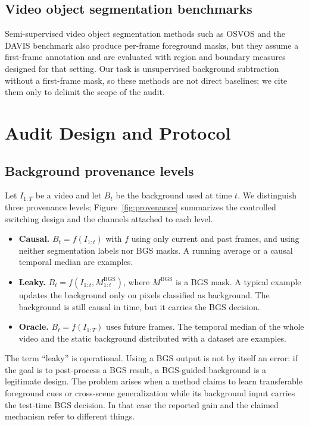 \documentclass[sn-mathphys-num,iicol]{sn-jnl}
\begin{document}
\subsection{Video object segmentation benchmarks}
Semi-supervised video object segmentation methods such as OSVOS
\cite{osvos2017} and the DAVIS benchmark \cite{davis2016} also produce per-frame
foreground masks, but they assume a first-frame annotation and are evaluated with
region and boundary measures designed for that setting. Our task is unsupervised
background subtraction without a first-frame mask, so these methods are not
direct baselines; we cite them only to delimit the scope of the audit.

\section{Audit Design and Protocol}\label{sec:protocol}

\subsection{Background provenance levels}\label{sec:provenance}

Let $I_{1:T}$ be a video and let $B_t$ be the background used at time $t$. We
distinguish three provenance levels; Figure~\ref{fig:provenance} summarizes the
controlled switching design and the channels attached to each level.
\begin{itemize}
\item \textbf{Causal.} $B_t = f(I_{1:t})$ with $f$ using only current and past
frames, and using neither segmentation labels nor BGS masks. A running average or
a causal temporal median are examples.
\item \textbf{Leaky.} $B_t = f(I_{1:t}, M_{1:t}^{\mathrm{BGS}})$, where
$M^{\mathrm{BGS}}$ is a BGS mask. A typical example updates the background only
on pixels classified as background. The background is still causal in time, but
it carries the BGS decision.
\item \textbf{Oracle.} $B_t = f(I_{1:T})$ uses future frames. The temporal median
of the whole video and the static background distributed with a dataset are
examples.
\end{itemize}

The term ``leaky'' is operational. Using a BGS output is not by itself an error:
if the goal is to post-process a BGS result, a BGS-guided background is a
legitimate design. The problem arises when a method claims to learn transferable
foreground cues or cross-scene generalization while its background input carries
the test-time BGS decision. In that case the reported gain and the claimed
mechanism refer to different things.
\end{document}
